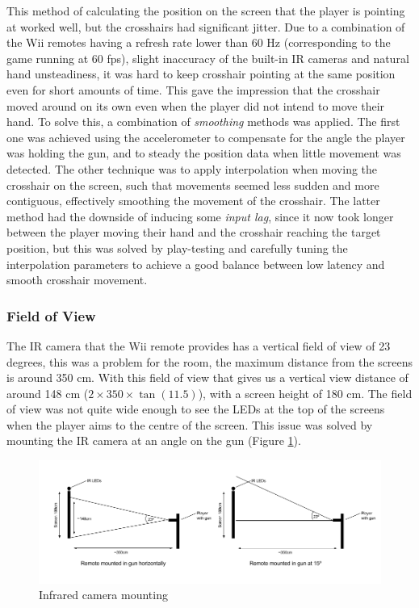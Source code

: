 \documentclass[a4paper,11pt]{article}
\begin{document}
This method of calculating the position on the screen that the player is pointing at worked well, but the crosshairs had significant jitter. Due to a combination of the Wii remotes having a refresh rate lower than 60 Hz (corresponding to the game running at 60 fps), slight inaccuracy of the built-in IR cameras and natural hand unsteadiness, it was hard to keep crosshair pointing at the same position even for short amounts of time. This gave the impression that the crosshair moved around on its own even when the player did not intend to move their hand. To solve this, a combination of \emph{smoothing} methods was applied. The first one was achieved using the accelerometer to compensate for the angle the player was holding the gun, and to steady the position data when little movement was detected. The other technique was to apply interpolation when moving the crosshair on the screen, such that movements seemed less sudden and more contiguous, effectively smoothing the movement of the crosshair. The latter method had the downside of inducing some \emph{input lag}, since it now took longer between the player moving their hand and the crosshair reaching the target position, but this was solved by play-testing and carefully tuning the interpolation parameters to achieve a good balance between low latency and smooth crosshair movement.

\subsubsection{Field of View}
The IR camera that the Wii remote provides has a vertical field of view of 23 degrees, this was a problem for the room, the maximum distance from the screens is around 350 cm. With this field of view that gives us a vertical view distance of around 148 cm ($2 \times 350 \times \tan(11.5)$), with a screen height of 180 cm. The field of view was not quite wide enough to see the LEDs at the top of the screens when the player aims to the centre of the screen. This issue was solved by mounting the IR camera at an angle on the gun (Figure \ref{fig:ir_mounting}).

\begin{figure}
	\centering
	\includegraphics[scale=0.5]{ir}
    \caption{Infrared camera mounting}
    \label{fig:ir_mounting}
\end{figure}
\end{document}
